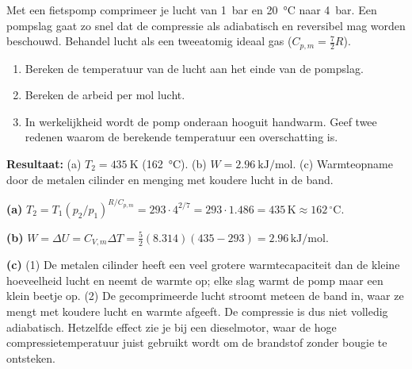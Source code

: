 \begin{oefening}
Met een fietspomp comprimeer je lucht van \SI{1}{\bar} en \SI{20}{\celsius} naar \SI{4}{\bar}. Een pompslag gaat zo snel dat de compressie als adiabatisch en reversibel mag worden beschouwd. Behandel lucht als een tweeatomig ideaal gas ($C_{p,m} = \frac{7}{2}R$).
\begin{enumerate}
\item[(a)] Bereken de temperatuur van de lucht aan het einde van de pompslag.
\item[(b)] Bereken de arbeid per mol lucht.
\item[(c)] In werkelijkheid wordt de pomp onderaan hooguit handwarm. Geef twee redenen waarom de berekende temperatuur een overschatting is.
\end{enumerate}
\end{oefening}
\begin{oplossing}
\textbf{Resultaat:} (a) $T_2 = \SI{435}{\kelvin}$ (\SI{162}{\celsius}). (b) $W = \SI{2.96}{\kilo\joule\per\mole}$. (c) Warmteopname door de metalen cilinder en menging met koudere lucht in de band.

\textbf{(a)} $T_2 = T_1 (p_2/p_1)^{R/C_{p,m}} = 293 \cdot 4^{2/7} = 293 \cdot 1.486 = 435\,\mathrm{K} \approx 162\,^\circ\mathrm{C}$.

\textbf{(b)} $W = \Delta U = C_{V,m}\Delta T = \tfrac{5}{2}(8.314)(435-293) = 2.96\,\mathrm{kJ/mol}$.

\textbf{(c)} (1) De metalen cilinder heeft een veel grotere warmtecapaciteit dan de kleine hoeveelheid lucht en neemt de warmte op; elke slag warmt de pomp maar een klein beetje op. (2) De gecomprimeerde lucht stroomt meteen de band in, waar ze mengt met koudere lucht en warmte afgeeft. De compressie is dus niet volledig adiabatisch. Hetzelfde effect zie je bij een dieselmotor, waar de hoge compressietemperatuur juist gebruikt wordt om de brandstof zonder bougie te ontsteken.
\end{oplossing}

